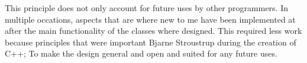 \documentclass[b5paper,11 pt]{report}
\begin{document}
This principle does not only account for future uses by other programmers.
In multiple occations, aspects that are where new to me have been implemented at after the main functionality of the classes where designed. 
This required less work because principles that were important Bjarne Stroustrup during the creation of C++; To make the design general and open and suited for any future uses. %

%
%
\end{document}
